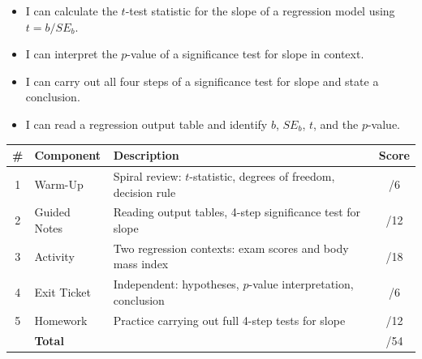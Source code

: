 \documentclass[10pt]{article}
\begin{document}

\vspace{2.4cm}
\namedateperiod

\begin{learningtargetbox}
\begin{itemize}
    \item I can calculate the $t$-test statistic for the slope of a regression model
          using $t = b / SE_b$.
    \item I can interpret the $p$-value of a significance test for slope in context.
    \item I can carry out all four steps of a significance test for slope and state
          a conclusion.
    \item I can read a regression output table and identify $b$, $SE_b$, $t$, and
          the $p$-value.
\end{itemize}
\end{learningtargetbox}

\begin{tocbox}
\renewcommand{\arraystretch}{1.5}
\begin{tabularx}{\linewidth}{clXc}
    \textbf{\#} & \textbf{Component} & \textbf{Description} & \textbf{Score} \\
    \hline
    1 & Warm-Up      & Spiral review: $t$-statistic, degrees of freedom, decision rule & \hfill/6 \\
    2 & Guided Notes & Reading output tables, 4-step significance test for slope & \hfill/12 \\
    3 & Activity     & Two regression contexts: exam scores and body mass index & \hfill/18 \\
    4 & Exit Ticket  & Independent: hypotheses, $p$-value interpretation, conclusion & \hfill/6 \\
    5 & Homework     & Practice carrying out full 4-step tests for slope & \hfill/12 \\
    \hline
       & \multicolumn{2}{l}{\textbf{Total}} & \hfill/54 \\
\end{tabularx}
\end{tocbox}
\end{document}
